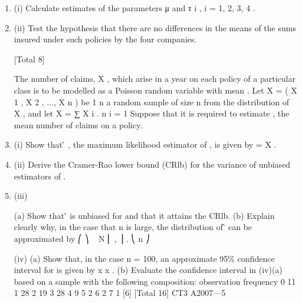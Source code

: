 \documentclass[a4paper,12pt]{article}
\begin{document}
\begin{enumerate}

[Total 5]
A random sample of insurance policies of a certain type was examined for each of
four insurance companies and the sums insured ( y ij , for companies i = 1, 2, 3, 4)
under each policy are given in the table below (in units of £100):
Company
1
2
3
4
For these data,
CT3 A2007—4
Total
58.2
56.3
50.1
52.9
57.2
54.5
54.2
49.9
58.4
57.0
55.5
50.0
55.8
55.3
51.7
54.9
284.5
223.1
159.8
204.5
∑ i ∑ j y ij = 871.9 and ∑ i ∑ j y ij 2 = 47, 633.53Consider the ANOVA model Y ij = μ + τ i + e ij , i = 1,..., 4, j = 1,..., n i , where Y ij is the j th
sum insured for company i , n i is the number of responses for company i ,
e ij ~ N (0, \sigma^2 ) are independent errors, and
11
∑ i = 1 n i τ i = 0 .
4
\item (i) Calculate estimates of the parameters μ and τ i , i = 1, 2, 3, 4 .
\item (ii) Test the hypothesis that there are no differences in the means of the sums
insured under such policies by the four companies.

[Total 8]


The number of claims, X , which arise in a year on each policy of a particular class is to be modelled as a Poisson random variable with mean \lambda. Let X = ( X 1 , X 2 , ..., X n ) be
1 n
a random sample of size n from the distribution of X , and let X = ∑ X i .
n i = 1
Suppose that it is required to estimate \lambda , the mean number of claims on a policy.
\item (i) Show that \lambdâ , the maximum likelihood estimator of \lambda, is given by \hat{\lambda} = X . 
\item (ii) Derive the Cramer-Rao lower bound (CRlb) for the variance of unbiased estimators of \lambda.
\item (iii)

(a) Show that \lambdâ is unbiased for \lambda and that it attains the CRlb.
(b) Explain clearly why, in the case that n is large, the distribution of \lambdâ can be approximated by
⎛ \lambda ⎞
\hat{\lambda} ~ N ⎜ \lambda , ⎟ .
⎝ n ⎠

(iv)
(a)
Show that, in the case n = 100, an approximate 95\% confidence interval for \lambda is given by
x  x .
(b)
Evaluate the confidence interval in (iv)(a) based on a sample with the
following composition:
observation
frequency
0
11
1
28
2
19
3
28
4
9
5
2
6
2
7
1
[6]
[Total 16]
CT3 A2007—5


\end{enumerate}
\end{document}
